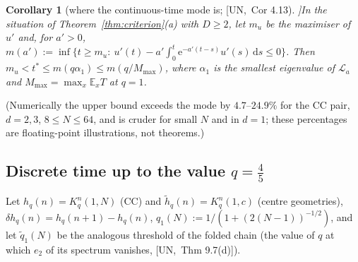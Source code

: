 \documentclass[10pt,a4paper]{article}
\theoremstyle{plain}
\newtheorem{corollary}[theorem]{Corollary}
\theoremstyle{definition}
\newcommand{\src}[2]{[\textsf{#1},~#2]}           %
\newcommand{\UNI}{\textsf{UN}}
\newcommand{\E}{\mathbb{E}}
\newcommand{\Lg}{\mathcal{L}}
\newcommand{\ee}{\mathrm{e}}
\newcommand{\dd}{\mathrm{d}}
\begin{document}
\begin{corollary}[where the continuous-time mode is; \src{\UNI}{Cor 4.13}]\label{cor:modelocation}
In the situation of Theorem~\ref{thm:criterion}(a) with $D\ge2$, let $m_u$ be the maximiser of $u'$ and, for $a'>0$, $m(a'):=\inf\{t\ge m_u:\ u'(t)-a'\int_0^t\ee^{-a'(t-s)}u'(s)\,\dd s\le0\}$. Then $m_u<t^*\le m(q\alpha_1)\le m(q/M_{\max})$, where $\alpha_1$ is the smallest eigenvalue of $\Lg_a$ and $M_{\max}=\max_x\E_xT$ at $q=1$.
\end{corollary}
(Numerically the upper bound exceeds the mode by $4.7$--$24.9\%$ for the CC pair, $d=2,3$, $8\le N\le64$, and is cruder for small $N$ and in $d=1$; these percentages are floating-point illustrations, not theorems.)

\subsection{Discrete time up to the value $q=\frac45$}

Let $h_q(n)=K_q^n(1,N)$ (CC) and $\tilde h_q(n)=K_q^n(1,c)$ (centre geometries), $\delta h_q(n)=h_q(n+1)-h_q(n)$, $q_1(N):=1/(1+(2(N-1))^{-1/2})$, and let $\tilde q_1(N)$ be the analogous threshold of the folded chain (the value of $q$ at which $e_2$ of its spectrum vanishes, \src{\UNI}{Thm 9.7(d)}).
\end{document}
